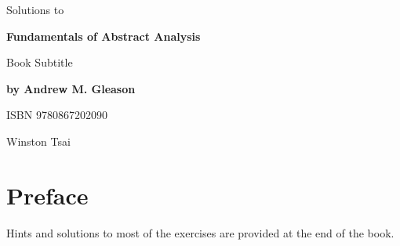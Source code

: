 \documentclass{report}
\begin{document}
\begin{titlepage}
  \begin{center}
    \vspace*{1cm}
    \LARGE
    Solutions to

    \vspace{0.5cm}

    \Huge
    \textbf{Fundamentals of Abstract Analysis}

    \huge
    Book Subtitle

    \LARGE
    \textbf{by Andrew M. Gleason}

    \vspace{0.2cm}

    \large
    ISBN 9780867202090

    \vfill

    \LARGE{Winston Tsai}
  \end{center}
\end{titlepage}
\newpage

\section*{Preface}
Hints and solutions to most of the exercises are provided at the end of the book.

\newpage
\tableofcontents
\newpage
















\end{document}
